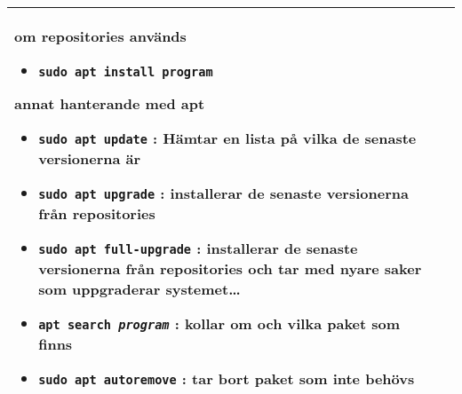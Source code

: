 \documentclass[a4paper]{article}
\begin{document}
\begin{longtable}{l|l}
\begin{minipage}[t]{0.8\textwidth}
\textbf{om repositories anv\"ands}

\begin{itemize}

\item
  \texttt{sudo apt install program}
\end{itemize}

\textbf{annat hanterande med apt}

\begin{itemize}
\item
  \texttt{sudo apt update} : H\"amtar en lista p{\aa} vilka de senaste versionerna \"ar
\item
  \texttt{sudo apt upgrade} : installerar de senaste versionerna fr{\aa}n
  repositories
\item
  \texttt{sudo apt full-upgrade} : installerar de senaste versionerna fr{\aa}n
  repositories och tar med nyare saker som uppgraderar systemet\ldots{}
\item
  \texttt{apt search \emph{program}} : kollar om och vilka paket som finns
\item
  \texttt{sudo apt autoremove} : tar bort paket som inte beh\"ovs
\end{itemize}
  \end{minipage}\\
  \bottomrule
  
\end{longtable}
  
\end{document}
